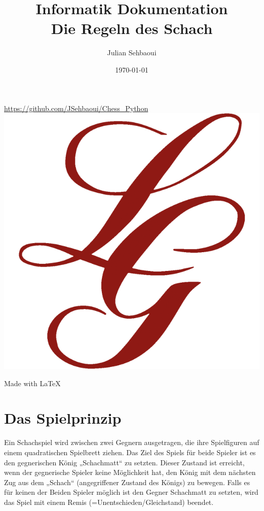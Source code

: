 \documentclass[a4paper, 10pt]{scrartcl}
\title{Informatik Dokumentation\\Die Regeln des Schach}
\author{Julian Sehbaoui}
\date{\today}
\begin{document}
\begin{titlepage}
    \maketitle
    \centering
    \url{https://github.com/JSehbaoui/Chess_Python}\\
     \vspace{5pt} 
    \includegraphics[scale=0.35]{assets/luisengymnasium.png}\\
     \vspace{5pt} 
    
    Made with \LaTeX{}
\end{titlepage}

\tableofcontents

\pagebreak

\section{Das Spielprinzip}
Ein Schachspiel wird zwischen zwei Gegnern ausgetragen, die ihre Spielfiguren auf einem quadratischen Spielbrett ziehen. 
Das Ziel des Spiels für beide Spieler ist es den gegnerischen König „Schachmatt“ zu setzten. Dieser Zustand ist erreicht, wenn der gegnerische Spieler keine Möglichkeit hat, den König mit dem nächsten Zug aus dem „Schach“ (angegriffener Zustand des Königs) zu bewegen. 
Falls es für keinen der Beiden Spieler möglich ist den Gegner Schachmatt zu setzten, wird das Spiel mit einem Remis (=Unentschieden/Gleichstand) beendet.
\end{document}
